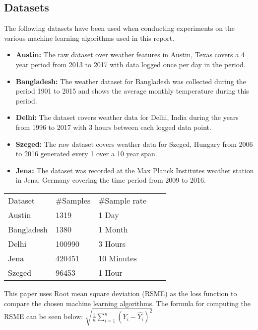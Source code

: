 \label{sec:ExpRes}
\subsection{Datasets}
The following datasets have been used when conducting experiments on the various machine learning algorithms used in this report.
\begin{itemize}
    \item \textbf{Austin:} The raw dataset over weather features in Austin, Texas covers a 4 year period from 2013 to 2017 with data logged once per day in the period.
    \item \textbf{Bangladesh:} The weather dataset for Bangladesh was collected during the period 1901 to 2015 and shows the average monthly temperature during this period. 
    \item \textbf{Delhi:} The dataset covers weather data for Delhi, India during the years from 1996 to 2017 with 3 hours between each logged data point.
    \item \textbf{Szeged:} The raw dataset covers weather data for Szeged, Hungary from 2006 to 2016 generated every 1 over a 10 year span.
    \item \textbf{Jena:} The dataset was recorded at the Max Planck Institutes weather station in Jena, Germany covering the time period from 2009 to 2016.
\end{itemize}

\begin{table}[!ht]
\centering
\begin{tabular}{|l|l|l|ll}
\cline{1-3}
Dataset    & \#Samples & \#Sample rate &  &  \\ \cline{1-3}
Austin     & 1319      & 1 Day         &  &  \\ \cline{1-3}
Bangladesh & 1380      & 1 Month       &  &  \\ \cline{1-3}
Delhi      & 100990    & 3 Hours       &  &  \\ \cline{1-3}
Jena       & 420451    & 10 Minutes    &  &  \\ \cline{1-3}
Szeged     & 96453     & 1 Hour        &  &  \\ \cline{1-3}
\end{tabular}
\end{table}

This paper uses Root mean square deviation (RSME) as the loss function to compare the chosen machine learning algorithms. The formula for computing the RSME can be seen below: 
$\sqrt{\frac 1 n \displaystyle\sum_{i=1}^n(Y_i - \hat{Y_i})^2}$

